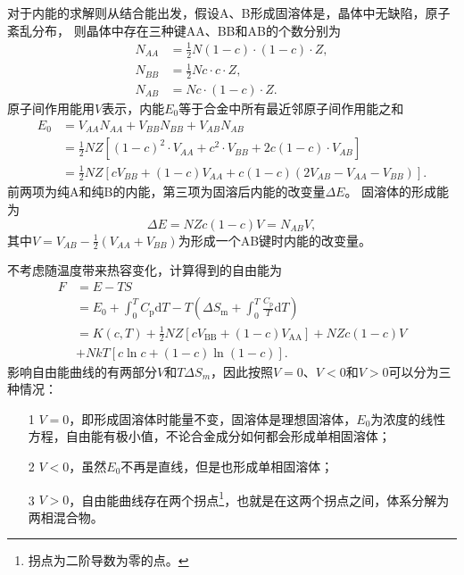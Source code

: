             对于内能的求解则从结合能出发，假设A、B形成固溶体是，晶体中无缺陷，原子紊乱分布，
            则晶体中存在三种键AA、BB和AB的个数分别为
            \begin{align}
                N_{AA}&=\frac{1}{2}N(1-c)\cdot(1-c)\cdot Z,\\
                N_{B B}&=\frac{1}{2} N c \cdot c \cdot Z,\\
                N_{A B}&=N c \cdot(1-c) \cdot Z.
            \end{align}
            原子间作用能用$V$表示，内能$E_0$等于合金中所有最近邻原子间作用能之和
            \begin{equation}
                \begin{aligned}
                    E_{0}&=V_{A A} N_{A A}+V_{B B} N_{B B}+V_{A B} N_{A B}\\
                    &=\frac{1}{2} N Z\left[(1-c)^{2} \cdot V_{A A}+c^{2} \cdot V_{B B}+2 c(1-c) \cdot V_{A B}\right]\\
                    &=\frac{1}{2} N Z\left[c V_{B B}+(1-c) V_{A A}+c(1-c)\left(2 V_{A B}-V_{A A}-V_{B B}\right)\right].
                \end{aligned}\label{固溶体内能与成键关系的一般表达式}
            \end{equation}
            前两项为纯A和纯B的内能，第三项为固溶后内能的改变量$\Delta E$。
            固溶体的形成能为
            \begin{equation}
                \Delta E=NZc(1-c)V=N_{AB}V,
            \end{equation}
            其中$V=V_{AB}-\frac{1}{2}(V_{AA}+V_{BB})$为形成一个AB键时内能的改变量。
            
            不考虑随温度带来热容变化，计算得到的自由能为
            \begin{equation}
                \begin{aligned}
                    F&=E-TS\\
                    &=E_0+\int_{0}^{T} C_{\mathrm{p}} \mathrm{d} T-T\left(\Delta S_{\mathrm{m}}+\int_{0}^{T} \frac{C_{\mathrm{p}}}{T} \mathrm{d} T\right)\\
                    &=K(c, T)+\frac{1}{2} N Z\left[c V_{\mathrm{BB}}+(1-c) V_{\mathrm{AA}}\right]+N Z c(1-c) V\\
                    &+N k T[c \ln c+(1-c) \ln (1-c)].
                \end{aligned}\label{固溶体自由能的表达式}
            \end{equation}
            影响自由能曲线的有两部分$V$和$T\Delta S_m$，因此按照$V=0$、$V<0$和$V>0$可以分为三种情况：
            \begin{enumerate}
                \item[1] $V=0$，即形成固溶体时能量不变，固溶体是理想固溶体，$E_0$为浓度的线性方程，自由能有极小值，不论合金成分如何都会形成单相固溶体；
                \item[2] $V<0$，虽然$E_0$不再是直线，但是也形成单相固溶体；
                \item[3] $V>0$，自由能曲线存在两个拐点\footnote{拐点为二阶导数为零的点。}，也就是在这两个拐点之间，体系分解为两相混合物。
            \end{enumerate}


